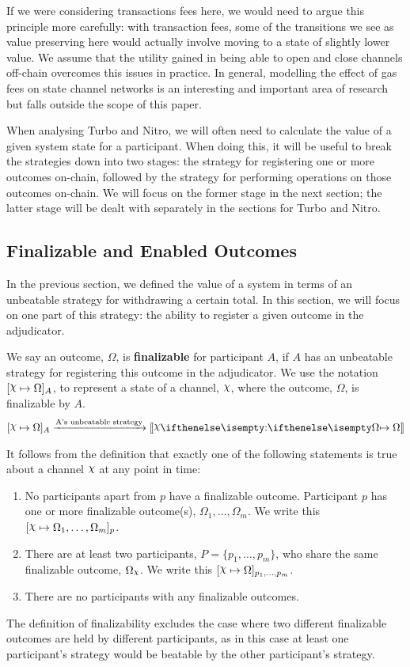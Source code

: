 \documentclass{article}
\begin{document}
If we were considering transactions fees here, we would need to argue this principle more
carefully: with transaction fees, some of the transitions we see as value preserving here
would actually involve moving to a state of slightly lower value. 
We assume that the utility gained in being able to open and close channels off-chain overcomes
this issues in practice.
In general, modelling the effect of gas fees on state channel networks is an interesting and important area of research but falls outside the scope of this paper.

When analysing Turbo and Nitro, we will often need to calculate the value of a given system
state for a participant.
When doing this, it will be useful to break the strategies down into two stages: the strategy
for registering one or more outcomes on-chain, followed by the strategy for performing operations
on those outcomes on-chain.
We will focus on the former stage in the next section; the latter stage will be dealt with
separately in the sections for Turbo and Nitro.

\subsection{Finalizable and Enabled Outcomes}

In the previous section, we defined the value of a system in terms of an unbeatable strategy
for withdrawing a certain total.
In this section, we will focus on one part of this strategy: the ability to register a given
outcome in the adjudicator.

We say an outcome, $\Omega$, is \textbf{finalizable} for participant $A$, if $A$ has an unbeatable
strategy for registering this outcome in the adjudicator.
We use the notation $\finalizable{\rchi}{\Omega}{A}$, to represent a state of a channel, $\rchi$,
where the outcome, $\Omega$, is finalizable by $A$.
\begin{align*}
  \finalizable{\rchi}{\Omega}{A} \xrightarrow{\text{A's unbeatable strategy}} \adj{\holds{\rchi}{}{\Omega}}
\end{align*}

It follows from the definition that exactly one of the following statements is true about
a channel $\rchi$ at any point in time:
\begin{enumerate}
  \item No participants apart from $p$ have a finalizable outcome.
        Participant $p$ has one or more finalizable outcome(s), $\Omega_1, \dots, \Omega_m$.
        We write this $\finalizable{\rchi}{\Omega_1, \dots, \Omega_m}{p}$.
  \item There are at least two participants, $P = \{p_1, \dots, p_m \}$, who share the same
        finalizable outcome, $\Omega_\rchi$. We write this $\finalizable{\rchi}{\Omega}{p_1, \dots, p_m}$.
  \item There are no participants with any finalizable outcomes.
\end{enumerate}
The definition of finalizability excludes the case where two different finalizable outcomes are held
by different participants, as in this case at least one participant's strategy would be beatable
by the other participant's strategy.
\end{document}
